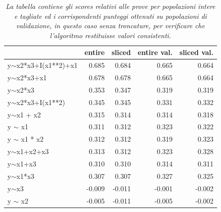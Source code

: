 \documentclass[12pt,openright,twoside,a4paper]{book}
\begin{document}
\begin{table}[!h]
\begin{tabular}{lrrrr}
\toprule
{} &  entire &  sliced &  entire val. &  sliced val. \\
\midrule
y$\sim$x2*x3+I(x1**2)+x1 &         0.685 &         0.684 &             0.665 &             0.664 \\
y$\sim$x2*x3+x1          &         0.678 &         0.678 &             0.665 &             0.664 \\
y$\sim$x2*x3             &         0.353 &         0.347 &             0.319 &             0.319 \\
y$\sim$x2*x3+I(x1**2)    &         0.345 &         0.345 &             0.331 &             0.332 \\
y$\sim$x1 + x2           &         0.315 &         0.314 &             0.314 &             0.318 \\
y $\sim$ x1              &         0.311 &         0.312 &             0.323 &             0.322 \\
y $\sim$ x1 * x2         &         0.312 &         0.312 &             0.319 &             0.323 \\
y$\sim$x1+x2+x3          &         0.313 &         0.312 &             0.323 &             0.328 \\
y$\sim$x1+x3             &         0.310 &         0.310 &             0.314 &             0.311 \\
y$\sim$x1*x3             &         0.307 &         0.307 &             0.327 &             0.325 \\
y$\sim$x3                &        -0.009 &        -0.011 &            -0.001 &            -0.002 \\
y $\sim$ x2              &        -0.005 &        -0.011 &            -0.005 &            -0.002 \\
\bottomrule
\end{tabular}
\caption{\textit{La tabella contiene gli scores relativi alle prove per popolazioni intere e tagliate ed i corrispondenti punteggi  ottenuti su popolazioni di validazione, in questo caso senza troncature, per verificare che l'algoritmo restituisse valori consistenti.}}
\end{table}
\end{document}
